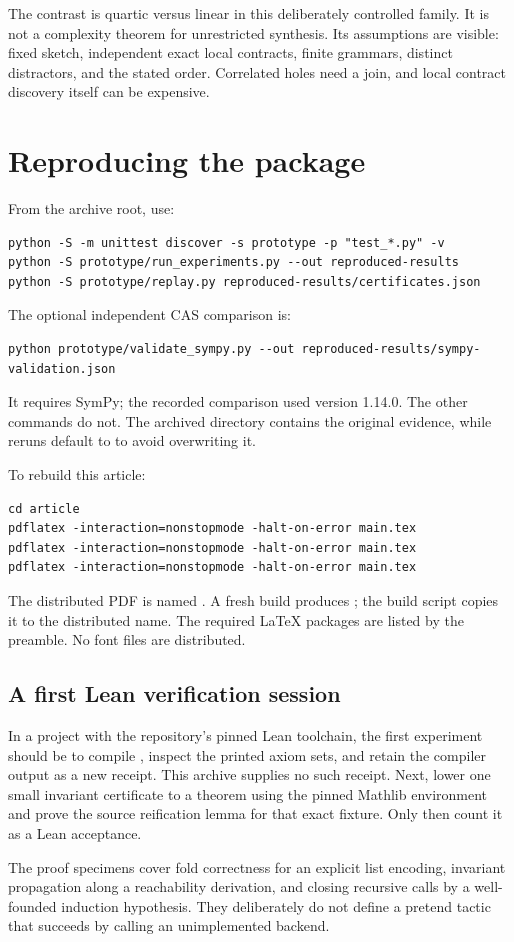 The contrast is quartic versus linear in this deliberately controlled family.
It is not a complexity theorem for unrestricted synthesis. Its assumptions are
visible: fixed sketch, independent exact local contracts, finite grammars,
distinct distractors, and the stated order. Correlated holes need a join, and
local contract discovery itself can be expensive.

\section{Reproducing the package}

From the archive root, use:
\begin{lstlisting}
python -S -m unittest discover -s prototype -p "test_*.py" -v
python -S prototype/run_experiments.py --out reproduced-results
python -S prototype/replay.py reproduced-results/certificates.json
\end{lstlisting}
The optional independent CAS comparison is:
\begin{lstlisting}
python prototype/validate_sympy.py --out reproduced-results/sympy-validation.json
\end{lstlisting}
It requires SymPy; the recorded comparison used version 1.14.0. The other commands
do not. The archived  directory contains the original evidence,
while reruns default to  to avoid overwriting it.

To rebuild this article:
\begin{lstlisting}
cd article
pdflatex -interaction=nonstopmode -halt-on-error main.tex
pdflatex -interaction=nonstopmode -halt-on-error main.tex
pdflatex -interaction=nonstopmode -halt-on-error main.tex
\end{lstlisting}
The distributed PDF is named . A fresh build produces
; the build script copies it to the distributed name. The required
LaTeX packages are listed by the preamble. No font files are distributed.

\subsection{A first Lean verification session}

In a project with the repository's pinned Lean toolchain, the first experiment
should be to compile , inspect the printed axiom sets,
and retain the compiler output as a new receipt. This archive supplies no such
receipt. Next, lower one small invariant certificate to a theorem using the
pinned Mathlib environment and prove the source reification lemma for that exact
fixture. Only then count it as a Lean acceptance.

The proof specimens cover fold correctness for an explicit list encoding,
invariant propagation along a reachability derivation, and closing recursive
calls by a well-founded induction hypothesis. They deliberately do not define
a pretend \forge{} tactic that succeeds by calling an unimplemented backend.
